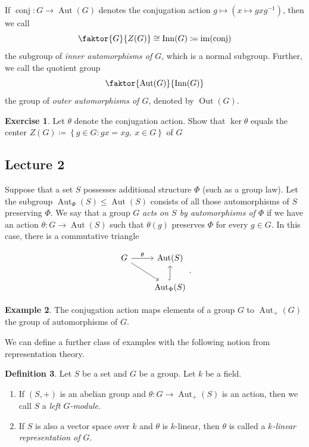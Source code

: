 \documentclass[10pt,letterpaper,cm]{nupset}
\theoremstyle{definition}
\newtheorem{definition}{Definition}[subsection]
\newtheorem{exmp}[definition]{Example}
\theoremstyle{theorem}
\newtheorem{exercise}[definition]{Exercise}
\theoremstyle{remark}
\newcommand{\1}{\mathbf{1}}
\newcommand{\0}{\vec 0}
\DeclareMathOperator{\aut}{Aut}
\DeclareMathOperator{\inn}{Inn}
\DeclareMathOperator{\out}{Out}
\DeclareMathOperator{\im}{im}
\DeclareMathOperator{\conj}{conj}
\begin{document}
\smallskip

If $\conj: G \to \aut(G)$ denotes the conjugation action $g \mapsto \left(x\mapsto gxg^{-1}\right)$, then we call $$\faktor{G}{Z(G)} \cong  \inn(G)\coloneqq  \im(\conj)$$ the subgroup of \textit{inner automorphisms of $G$}, which is a normal subgroup. Further, we call the quotient group $$\faktor{\aut(G)}{\inn(G)}$$ the group of \textit{outer automorphisms of $G$}, denoted by $\out(G)$.

\begin{exercise}
Let $\theta$ denote the conjugation action. Show that $\ker{\theta}$ equals the center $Z(G)\coloneqq \left\{g\in G: gx=xg, \ x\in G\right\}$ of $G$
\end{exercise}



\subsection{Lecture 2}

Suppose that a set $S$ possesses additional structure $\Phi$ (such as a group law). Let the subgroup $\aut_{\Phi}(S) \leq \aut(S)$ consists of all those automorphisms of $S$ preserving $\Phi$. We say that a group $G$ \textit{acts on $S$ by automorphisms of $\Phi$} if we have an action $\theta : G\to \aut(S)$ such that $\theta(g)$ preserves $\Phi$ for every $g\in G$.  In this case, there is a commutative triangle

\[ 
\begin{tikzcd}
G \arrow{r}{\theta} \arrow[swap]{dr} & \aut(S) \\%
 & \aut_{\Phi}(S) \arrow[hookrightarrow]{u}
\end{tikzcd}.
\]

\smallskip

\begin{exmp}
The conjugation action maps elements of a group $G$ to $\aut_{+}(G)$ the group of automorphisms of $G$.
\end{exmp}

We can define a further class of examples with the following notion from representation theory.

\begin{definition}  Let $S$ be a set and $G$ be a group. Let $k$ be a field.
\begin{enumerate}
\item If $\left(S, +\right)$ is an abelian group and $\theta : G \to \aut_+(S)$ is an action, then we call $S$ a \textit{left $G$-module}.
\item If $S$ is also a vector space over $k$ and $\theta$ is $k$-linear, then $\theta$ is called a \textit{$k$-linear representation of $G$}.
\end{enumerate}
\end{definition}
\end{document}
